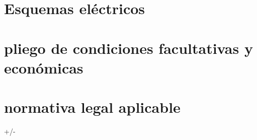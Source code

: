 \documentclass[spanish,openany]{report}
\begin{document}
\section{Esquemas eléctricos}


\section{pliego de condiciones facultativas y económicas}

\section{normativa legal aplicable}
		+/-




\end{document}
